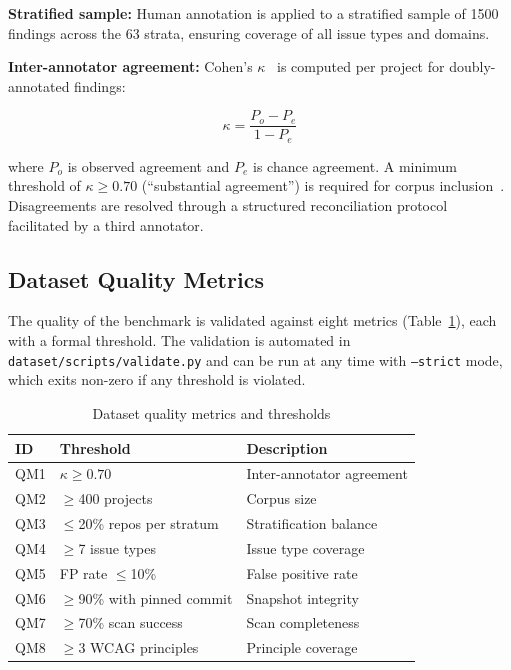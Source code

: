 \documentclass[10pt,conference]{IEEEtran}
\begin{document}
\textbf{Stratified sample:} Human annotation is applied to a stratified
sample of 1500 findings across the 63 strata, ensuring coverage of all issue
types and domains.

\textbf{Inter-annotator agreement:} Cohen's $\kappa$~\cite{cohen1960} is
computed per project for doubly-annotated findings:

\begin{equation}
  \kappa = \frac{P_o - P_e}{1 - P_e}
  \label{eq:kappa}
\end{equation}

where $P_o$ is observed agreement and $P_e$ is chance agreement.  A minimum
threshold of $\kappa \geq 0.70$ (``substantial agreement'') is required for
corpus inclusion~\cite{landis1977}.  Disagreements are resolved through a
structured reconciliation protocol facilitated by a third annotator.

\subsection{Dataset Quality Metrics}

The quality of the benchmark is validated against eight metrics
(Table~\ref{tab:quality}), each with a formal threshold.  The validation
is automated in \texttt{dataset/scripts/validate.py} and can be run at any
time with \texttt{--strict} mode, which exits non-zero if any threshold is
violated.

\begin{table}[htbp]
\caption{Dataset quality metrics and thresholds}
\label{tab:quality}
\centering\small
\begin{tabularx}{\columnwidth}{llX}
\toprule
\textbf{ID} & \textbf{Threshold} & \textbf{Description} \\
\midrule
QM1 & $\kappa \geq 0.70$ & Inter-annotator agreement \\
QM2 & $\geq$400 projects & Corpus size \\
QM3 & $\leq$20\% repos per stratum & Stratification balance \\
QM4 & $\geq$7 issue types & Issue type coverage \\
QM5 & FP rate $\leq$10\% & False positive rate \\
QM6 & $\geq$90\% with pinned commit & Snapshot integrity \\
QM7 & $\geq$70\% scan success & Scan completeness \\
QM8 & $\geq$3 WCAG principles & Principle coverage \\
\bottomrule
\end{tabularx}
\end{table}
\end{document}
